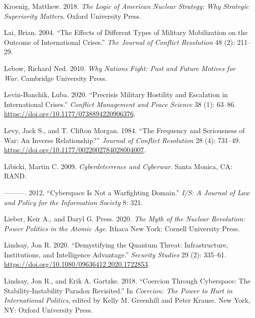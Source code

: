 \documentclass[
]{article}
\begin{document}
\leavevmode\hypertarget{ref-kroenig_logicamericannuclear_2018}{}%
Kroenig, Matthew. 2018. \emph{The Logic of American Nuclear Strategy: Why Strategic Superiority Matters}. Oxford University Press.

\leavevmode\hypertarget{ref-lai_effectsdifferenttypes_2004}{}%
Lai, Brian. 2004. ``The Effects of Different Types of Military Mobilization on the Outcome of International Crises.'' \emph{The Journal of Conflict Resolution} 48 (2): 211--29.

\leavevmode\hypertarget{ref-lebow_whynationsfight_2010}{}%
Lebow, Richard Ned. 2010. \emph{Why Nations Fight: Past and Future Motives for War}. Cambridge University Press.

\leavevmode\hypertarget{ref-levin-banchik_precrisismilitaryhostility_2020}{}%
Levin-Banchik, Luba. 2020. ``Precrisis Military Hostility and Escalation in International Crises.'' \emph{Conflict Management and Peace Science} 38 (1): 63--86. \url{https://doi.org/10.1177/0738894220906376}.

\leavevmode\hypertarget{ref-levy_frequencyseriousnesswar_1984}{}%
Levy, Jack S., and T. Clifton Morgan. 1984. ``The Frequency and Seriousness of War: An Inverse Relationship?'' \emph{Journal of Conflict Resolution} 28 (4): 731--49. \url{https://doi.org/10.1177/0022002784028004007}.

\leavevmode\hypertarget{ref-libicki_cyberdeterrencecyberwar_2009}{}%
Libicki, Martin C. 2009. \emph{Cyberdeterrence and Cyberwar}. Santa Monica, CA: RAND.

\leavevmode\hypertarget{ref-libicki_cyberspacenotwarfighting_2012}{}%
---------. 2012. ``Cyberspace Is Not a Warfighting Domain.'' \emph{I/S: A Journal of Law and Policy for the Information Society} 8: 321.

\leavevmode\hypertarget{ref-lieber_mythnuclearrevolution_2020}{}%
Lieber, Keir A., and Daryl G. Press. 2020. \emph{The Myth of the Nuclear Revolution: Power Politics in the Atomic Age}. Ithaca New York: Cornell University Press.

\leavevmode\hypertarget{ref-lindsay_demystifyingquantumthreat_2020}{}%
Lindsay, Jon R. 2020. ``Demystifying the Quantum Threat: Infrastructure, Institutions, and Intelligence Advantage.'' \emph{Security Studies} 29 (2): 335--61. \url{https://doi.org/10.1080/09636412.2020.1722853}.

\leavevmode\hypertarget{ref-lindsay_coercioncyberspacestabilityinstability_2018}{}%
Lindsay, Jon R., and Erik A. Gartzke. 2018. ``Coercion Through Cyberspace: The Stability-Instability Paradox Revisited.'' In \emph{Coercion: The Power to Hurt in International Politics}, edited by Kelly M. Greenhill and Peter Krause. New York, NY: Oxford University Press.
\end{document}
